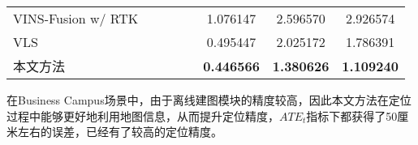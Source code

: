 \begin{table}
\begin{tabular}{lccccccc}
VINS-Fusion w/ RTK &                                                                                &                     &                     &                     & 1.076147          & 2.596570          & 2.926574          \\
VLS                &                                                                                &                     &                     &                     & 0.495447          & 2.025172          & 1.786391          \\
本文方法               &                                                                                &                     &                     &                     & \cellcolor[HTML]{FFCCC9}\textbf{0.446566} & \cellcolor[HTML]{FFCCC9}\textbf{1.380626} & \cellcolor[HTML]{FFCCC9}\textbf{1.109240}          \\ \bottomrule
\end{tabular}
\label{tab:loc_4seaons_bc56}
\end{table}

在Business Campus场景中，由于离线建图模块的精度较高，因此本文方法在定位过程中能够更好地利用地图信息，从而提升定位精度，$ATE_t$指标下都获得了50厘米左右的误差，已经有了较高的定位精度。

